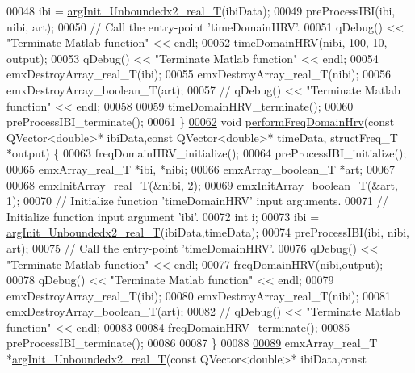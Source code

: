 \begin{DoxyCode}
00048     ibi = \hyperlink{group__HRV-Analysis_ga97aad354e1ec35fab4e98f111f4ed4b4}{argInit\_Unboundedx2\_real\_T}(ibiData);
00049     preProcessIBI(ibi, nibi, art);
00050     \textcolor{comment}{// Call the entry-point 'timeDomainHRV'.}
00051     qDebug() << \textcolor{stringliteral}{"Terminate Matlab function"} << endl;
00052     timeDomainHRV(nibi, 100, 10, output);
00053     qDebug() << \textcolor{stringliteral}{"Terminate Matlab function"} << endl;
00054     emxDestroyArray\_real\_T(ibi);
00055     emxDestroyArray\_real\_T(nibi);
00056     emxDestroyArray\_boolean\_T(art);
00057     \textcolor{comment}{//    qDebug() << "Terminate Matlab function" << endl;}
00058 
00059     timeDomainHRV\_terminate();
00060     preProcessIBI\_terminate();
00061 \}
\hypertarget{hrvanalysis_8cpp_source.tex_l00062}{}\hyperlink{group__HRV-Analysis_ga3cfec29967efe1561722a05d03f26158}{00062} \textcolor{keywordtype}{void} \hyperlink{group__HRV-Analysis_ga3cfec29967efe1561722a05d03f26158}{performFreqDomainHrv}(\textcolor{keyword}{const} QVector<double>* ibiData,\textcolor{keyword}{const} QVector<double>* 
      timeData, structFreq\_T *output) \{
00063     freqDomainHRV\_initialize();
00064     preProcessIBI\_initialize();
00065     emxArray\_real\_T *ibi, *nibi;
00066     emxArray\_boolean\_T *art;
00067 
00068     emxInitArray\_real\_T(&nibi, 2);
00069     emxInitArray\_boolean\_T(&art, 1);
00070     \textcolor{comment}{// Initialize function 'timeDomainHRV' input arguments.}
00071     \textcolor{comment}{// Initialize function input argument 'ibi'.}
00072     \textcolor{keywordtype}{int} i;
00073     ibi = \hyperlink{group__HRV-Analysis_ga97aad354e1ec35fab4e98f111f4ed4b4}{argInit\_Unboundedx2\_real\_T}(ibiData,timeData);
00074     preProcessIBI(ibi, nibi, art);
00075     \textcolor{comment}{// Call the entry-point 'timeDomainHRV'.}
00076     qDebug() << \textcolor{stringliteral}{"Terminate Matlab function"} << endl;
00077     freqDomainHRV(nibi,output);
00078     qDebug() << \textcolor{stringliteral}{"Terminate Matlab function"} << endl;
00079     emxDestroyArray\_real\_T(ibi);
00080     emxDestroyArray\_real\_T(nibi);
00081     emxDestroyArray\_boolean\_T(art);
00082     \textcolor{comment}{//    qDebug() << "Terminate Matlab function" << endl;}
00083 
00084     freqDomainHRV\_terminate();
00085     preProcessIBI\_terminate();
00086 
00087 \}
00088 
\hypertarget{hrvanalysis_8cpp_source.tex_l00089}{}\hyperlink{group__HRV-Analysis_ga97aad354e1ec35fab4e98f111f4ed4b4}{00089} emxArray\_real\_T *\hyperlink{group__HRV-Analysis_ga97aad354e1ec35fab4e98f111f4ed4b4}{argInit\_Unboundedx2\_real\_T}(\textcolor{keyword}{const} QVector<double>* ibiData,\textcolor{keyword}{const} 

\end{DoxyCode}
